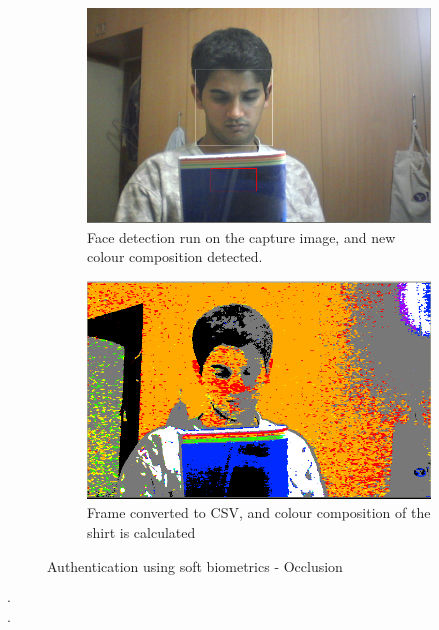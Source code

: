 \documentclass[12pt]{article}			%
\begin{document}
\begin{figure}[h!]
        \begin{subfigure}[b]{0.5\textwidth}
                \centering
                \includegraphics[scale=0.35]{img/soft5.png}
                \caption{Face detection run on the capture image, and new colour composition detected.}
                \label{fig:soft5_org}
        \end{subfigure}%
        \begin{subfigure}[b]{0.5\textwidth}
                \centering
                \includegraphics[scale=0.35]{img/soft5_csv.png}
                \caption{Frame converted to CSV, and colour composition of the shirt is calculated}
                \label{fig:soft5_csv}
        \end{subfigure}
        \caption{Authentication using soft biometrics - Occlusion }\label{fig:soft5}
\end{figure}
$\cdot$\\[10ex]
$\cdot$\\[10ex]
\newpage
\end{document}
